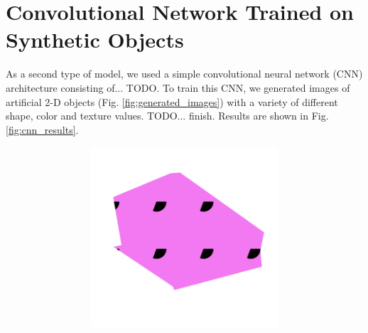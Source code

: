 \section{Convolutional Network Trained on Synthetic Objects}
\label{sec:simple_cnn}
As a second type of model, we used a simple convolutional neural network (CNN) architecture
consisting of... TODO. To train this CNN, we generated images of artificial 2-D objects
(Fig. \ref{fig:generated_images}) with a variety of different shape, color and texture values. TODO... finish.
Results are shown in Fig. \ref{fig:cnn_results}.

\begin{figure}[h!]
    \begin{center}
        \begin{subfigure}[b]{0.15\textwidth}
            \begin{center}
                \begin{subfigure}[b]{0.9\textwidth}
                    \includegraphics[width=\linewidth]{figures/generated_objects/img0000.png}
                \end{subfigure}
                \begin{subfigure}[b]{0.9\textwidth}

\end{subfigure}
\end{center}
\end{subfigure}
\end{center}
\end{figure}
